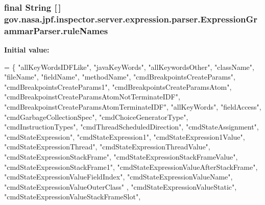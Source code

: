 \subsubsection[{\texorpdfstring{rule\+Names}{ruleNames}}]{\setlength{\rightskip}{0pt plus 5cm}final String \mbox{[}$\,$\mbox{]} gov.\+nasa.\+jpf.\+inspector.\+server.\+expression.\+parser.\+Expression\+Grammar\+Parser.\+rule\+Names\hspace{0.3cm}{\ttfamily [static]}}\hypertarget{classgov_1_1nasa_1_1jpf_1_1inspector_1_1server_1_1expression_1_1parser_1_1_expression_grammar_parser_a0591b60da1295151f737fcba5558f1a8}{}\label{classgov_1_1nasa_1_1jpf_1_1inspector_1_1server_1_1expression_1_1parser_1_1_expression_grammar_parser_a0591b60da1295151f737fcba5558f1a8}
{\bfseries Initial value\+:}
\begin{DoxyCode}
= \{
    \textcolor{stringliteral}{"allKeyWordsIDFLike"}, \textcolor{stringliteral}{"javaKeyWords"}, \textcolor{stringliteral}{"allKeywordsOther"}, \textcolor{stringliteral}{"className"}, 
    \textcolor{stringliteral}{"fileName"}, \textcolor{stringliteral}{"fieldName"}, \textcolor{stringliteral}{"methodName"}, \textcolor{stringliteral}{"cmdBreakpointsCreateParams"}, \textcolor{stringliteral}{"cmdBreakpointsCreateParams1"}, 
    \textcolor{stringliteral}{"cmdBreakpointsCreateParamsAtom"}, \textcolor{stringliteral}{"cmdBreakpoinstCreateParamsAtomNotTerminateIDF"}, 
    \textcolor{stringliteral}{"cmdBreakpoinstCreateParamsAtomTerminateIDF"}, \textcolor{stringliteral}{"allKeyWords"}, \textcolor{stringliteral}{"fieldAccess"}, 
    \textcolor{stringliteral}{"cmdGarbageCollectionSpec"}, \textcolor{stringliteral}{"cmdChoiceGeneratorType"}, \textcolor{stringliteral}{"cmdInstructionTypes"}, 
    \textcolor{stringliteral}{"cmdThreadScheduledDirection"}, \textcolor{stringliteral}{"cmdStateAssignment"}, \textcolor{stringliteral}{"cmdStateExpression"}, 
    \textcolor{stringliteral}{"cmdStateExpression1"}, \textcolor{stringliteral}{"cmdStateExpression1Value"}, \textcolor{stringliteral}{"cmdStateExpressionThread"}, 
    \textcolor{stringliteral}{"cmdStateExpressionThreadValue"}, \textcolor{stringliteral}{"cmdStateExpressionStackFrame"}, \textcolor{stringliteral}{"cmdStateExpressionStackFrameValue"}, 
    \textcolor{stringliteral}{"cmdStateExpressionStackFrame1"}, \textcolor{stringliteral}{"cmdStateExpressionValueAfterStackFrame"}, 
    \textcolor{stringliteral}{"cmdStateExpressionValueFieldIndex"}, \textcolor{stringliteral}{"cmdStateExpressionValueName"}, \textcolor{stringliteral}{"cmdStateExpressionValueOuterClass"}
      , 
    \textcolor{stringliteral}{"cmdStateExpressionValueStatic"}, \textcolor{stringliteral}{"cmdStateExpressionValueStackFrameSlot"}, 

\end{DoxyCode}
